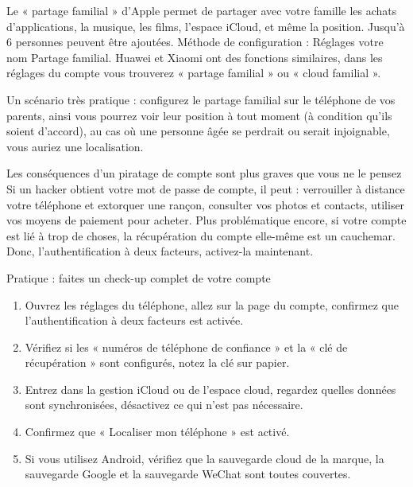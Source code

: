 Le « partage familial » d'Apple permet de partager avec votre famille les achats d'applications, la musique, les films, l'espace iCloud, et même la position. Jusqu'à 6 personnes peuvent être ajoutées. Méthode de configuration : Réglages votre nom Partage familial. Huawei et Xiaomi ont des fonctions similaires, dans les réglages du compte vous trouverez « partage familial » ou « cloud familial ».

Un scénario très pratique : configurez le partage familial sur le téléphone de vos parents, ainsi vous pourrez voir leur position à tout moment (à condition qu'ils soient d'accord), au cas où une personne âgée se perdrait ou serait injoignable, vous auriez une localisation.

\begin{tcbwarn}{Les conséquences d'un piratage de compte sont plus graves que vous ne le pensez}
Si un hacker obtient votre mot de passe de compte, il peut : verrouiller à distance votre téléphone et extorquer une rançon, consulter vos photos et contacts, utiliser vos moyens de paiement pour acheter. Plus problématique encore, si votre compte est lié à trop de choses, la récupération du compte elle-même est un cauchemar. Donc, l'authentification à deux facteurs, activez-la maintenant.

\end{tcbwarn}

\begin{tcbpractice}{Pratique : faites un check-up complet de votre compte}
\begin{enumerate}
  \item Ouvrez les réglages du téléphone, allez sur la page du compte, confirmez que l'authentification à deux facteurs est activée.
  \item Vérifiez si les « numéros de téléphone de confiance » et la « clé de récupération » sont configurés, notez la clé sur papier.
  \item Entrez dans la gestion iCloud ou de l'espace cloud, regardez quelles données sont synchronisées, désactivez ce qui n'est pas nécessaire.
  \item Confirmez que « Localiser mon téléphone » est activé.
  \item Si vous utilisez Android, vérifiez que la sauvegarde cloud de la marque, la sauvegarde Google et la sauvegarde WeChat sont toutes couvertes.
\end{enumerate}

\end{tcbpractice}
